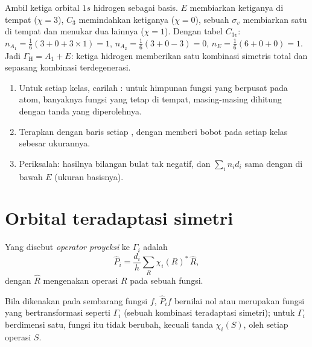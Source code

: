 \begin{example}\label{ex:b3:group-theory-applied:nh3}
Ambil ketiga orbital $1s$ hidrogen  sebagai basis. $E$ membiarkan
ketiganya di tempat ($\chi = 3$), $C_3$ memindahkan ketiganya ($\chi = 0$),
sebuah $\sigma_v$ membiarkan satu di tempat dan menukar dua lainnya
($\chi = 1$). Dengan tabel $C_{3v}$:
$n_{A_1} = \frac16(3 + 0 + 3\times1) = 1$, $n_{A_2} = \frac16(3 + 0 - 3) = 0$,
$n_E = \frac16(6 + 0 + 0) = 1$. Jadi $\Gamma_{\mathrm H} = A_1 + E$: ketiga
hidrogen memberikan satu kombinasi simetris total dan sepasang kombinasi
terdegenerasi.
\end{example}

\begin{method}\label{met:b3:group-theory-applied:reduce}
\begin{enumerate}
  \item Untuk setiap kelas, carilah : untuk himpunan fungsi yang
        berpusat pada atom, banyaknya fungsi yang tetap di tempat, masing-masing
        dihitung dengan tanda yang diperolehnya.
  \item Terapkan  dengan baris setiap ,
        dengan memberi bobot pada setiap kelas sebesar ukurannya.
  \item Periksalah: hasilnya bilangan bulat tak negatif, dan $\sum_in_id_i$
        sama dengan  di bawah $E$ (ukuran basisnya).
\end{enumerate}
\end{method}

\section{Orbital teradaptasi simetri}

\begin{definition}\label{def:b3:group-theory-applied:projection}
Yang disebut \emph{operator proyeksi} ke
 $\Gamma_i$ adalah
\[
\hat P_i = \frac{d_i}{h}\sum_R\chi_i(R)^*\,\hat R,
\]
dengan $\hat R$ mengenakan operasi $R$ pada sebuah fungsi.
\end{definition}

\begin{proposition}\label{prop:b3:group-theory-applied:projection}
Bila dikenakan pada sembarang fungsi $f$, $\hat P_if$ bernilai nol atau
merupakan fungsi yang bertransformasi seperti $\Gamma_i$ (sebuah kombinasi
teradaptasi simetri); untuk $\Gamma_i$ berdimensi satu, fungsi itu tidak
berubah, kecuali tanda $\chi_i(S)$, oleh setiap operasi $S$.
\end{proposition}

